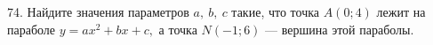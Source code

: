 74. Найдите значения параметров $a,\ b,\ c$ такие, что точка $A(0;4)$ лежит на параболе $y=ax^2+bx+c,$ а точка $N(-1;6)$ --- вершина этой параболы.\\
